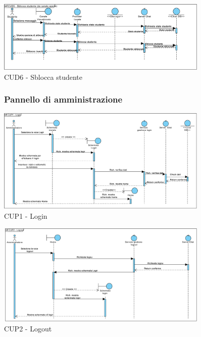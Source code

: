 \begin{figure}
	\centering
	\includegraphics[width=0.9\textwidth]{imgs/gruppo6/sequence/CUD6_sblocca_studente.pdf}
	\caption{CUD6 - Sblocca studente}
	\label{fig:seq-cud6}
\end{figure}

\pagebreak

\begin{figure}[!h]
	\subsubsection{Pannello di amministrazione}
	\centering
	\includegraphics[width=0.9\textwidth]{imgs/gruppo6/sequence/CUP1_Login.pdf}
	\caption{CUP1 - Login}
	\label{fig:seq-cup1}
\end{figure}

\begin{figure}
	\centering
	\includegraphics[width=0.9\textwidth]{imgs/gruppo6/sequence/CUP2_logout.pdf}
	\caption{CUP2 - Logout}
	\label{fig:seq-cup2}
\end{figure}

